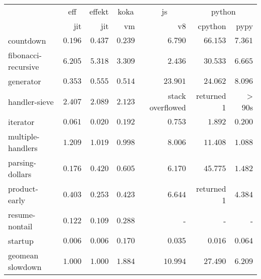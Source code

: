 \begin{tabular}{l r r r r r r}
\toprule & \multicolumn{1}{c}{eff} & \multicolumn{1}{c}{effekt} & \multicolumn{1}{c}{koka} & \multicolumn{1}{c}{js} & \multicolumn{2}{c}{python} \\
\cmidrule(l){2-2}\cmidrule(l){3-3}\cmidrule(l){4-4}\cmidrule(l){5-5}\cmidrule(l){6-7} 
 & jit & jit & vm & v8 & cpython & pypy \\
\midrule
countdown & $\mathbf{0.196}$ & $0.437$ & $0.239$ & $6.790$ & $66.153$ & $7.361$ \\
fibonacci-recursive & $6.205$ & $5.318$ & $3.309$ & $\mathbf{2.436}$ & $30.533$ & $6.665$ \\
generator & $\mathbf{0.353}$ & $0.555$ & $0.514$ & $23.901$ & $24.062$ & $8.096$ \\
handler-sieve & $2.407$ & $\mathbf{2.089}$ & $2.123$ & stack overflowed & returned 1 & > 90s \\
iterator & $0.061$ & $\mathbf{0.020}$ & $0.192$ & $0.753$ & $1.892$ & $0.200$ \\
multiple-handlers & $1.209$ & $1.019$ & $\mathbf{0.998}$ & $8.006$ & $11.408$ & $1.088$ \\
parsing-dollars & $\mathbf{0.176}$ & $0.420$ & $0.605$ & $6.170$ & $45.775$ & $1.482$ \\
product-early & $0.403$ & $\mathbf{0.253}$ & $0.423$ & $6.644$ & returned 1 & $4.384$ \\
resume-nontail & $0.122$ & $\mathbf{0.109}$ & $0.288$ & - & - & - \\
startup & $\mathbf{0.006}$ & $0.006$ & $0.170$ & $0.035$ & $0.016$ & $0.064$ \\
\midrule
 geomean slowdown & $1.000$ & $1.000$ & $1.884$ & $10.994$ & $27.490$ & $6.209$ \\
\bottomrule
\end{tabular}